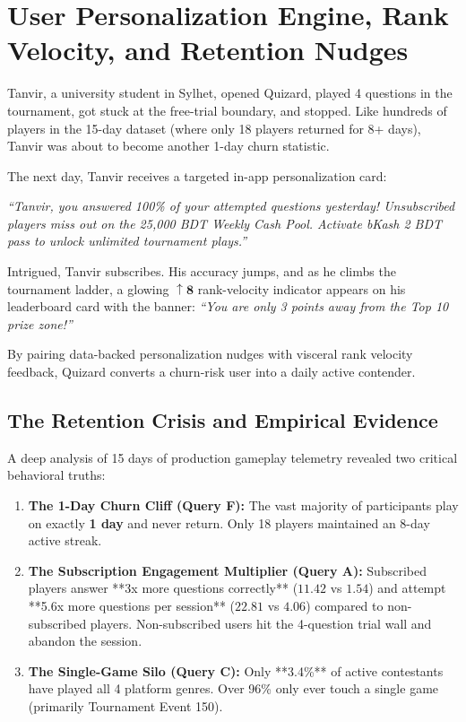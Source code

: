 \chapter{User Personalization Engine, Rank Velocity, and Retention Nudges}

\begin{tcolorbox}[storybox, title={The Story of Tanvir's Personalized Comeback}]
Tanvir, a university student in Sylhet, opened Quizard, played 4 questions in the tournament, got stuck at the free-trial boundary, and stopped. Like hundreds of players in the 15-day dataset (where only 18 players returned for 8+ days), Tanvir was about to become another 1-day churn statistic.

The next day, Tanvir receives a targeted in-app personalization card:
\begin{center}
\textit{``Tanvir, you answered 100\% of your attempted questions yesterday! Unsubscribed players miss out on the 25,000 BDT Weekly Cash Pool. Activate bKash 2 BDT pass to unlock unlimited tournament plays.''}
\end{center}

Intrigued, Tanvir subscribes. His accuracy jumps, and as he climbs the tournament ladder, a glowing $\boldsymbol{\uparrow 8}$ rank-velocity indicator appears on his leaderboard card with the banner: \textit{``You are only 3 points away from the Top 10 prize zone!''} 

By pairing data-backed personalization nudges with visceral rank velocity feedback, Quizard converts a churn-risk user into a daily active contender.
\end{tcolorbox}

\section{The Retention Crisis and Empirical Evidence}
A deep analysis of 15 days of production gameplay telemetry revealed two critical behavioral truths:

\begin{enumerate}
    \item \textbf{The 1-Day Churn Cliff (Query F):} The vast majority of participants play on exactly \textbf{1 day} and never return. Only 18 players maintained an 8-day active streak.
    \item \textbf{The Subscription Engagement Multiplier (Query A):} Subscribed players answer **3x more questions correctly** ($11.42$ vs $1.54$) and attempt **5.6x more questions per session** ($22.81$ vs $4.06$) compared to non-subscribed players. Non-subscribed users hit the 4-question trial wall and abandon the session.
    \item \textbf{The Single-Game Silo (Query C):} Only **3.4\%** of active contestants have played all 4 platform genres. Over 96\% only ever touch a single game (primarily Tournament Event 150).
\end{enumerate}

